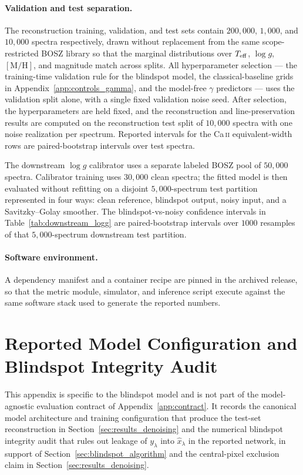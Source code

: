 \documentclass[twocolumn]{aastex7}
\newcounter{algorithm}
\begin{document}
\paragraph{Validation and test separation.}
The reconstruction training, validation, and test sets contain $200{,}000$, $1{,}000$, and $10{,}000$ spectra respectively, drawn without replacement from the same scope-restricted BOSZ library so that the marginal distributions over $T_{\rm eff}$, $\log g$, $[\mathrm{M}/\mathrm{H}]$, and magnitude match across splits. All hyperparameter selection --- the training-time validation rule for the blindspot model, the classical-baseline grids in Appendix~\ref{app:controls_gamma}, and the model-free $\gamma$ predictors --- uses the validation split alone, with a single fixed validation noise seed. After selection, the hyperparameters are held fixed, and the reconstruction and line-preservation results are computed on the reconstruction test split of $10{,}000$ spectra with one noise realization per spectrum. Reported intervals for the Ca\,\textsc{ii} equivalent-width rows are paired-bootstrap intervals over test spectra.

The downstream $\log g$ calibrator uses a separate labeled BOSZ pool of $50{,}000$ spectra. Calibrator training uses $30{,}000$ clean spectra; the fitted model is then evaluated without refitting on a disjoint $5{,}000$-spectrum test partition represented in four ways: clean reference, blindspot output, noisy input, and a Savitzky--Golay smoother. The blindspot-vs-noisy confidence intervals in Table~\ref{tab:downstream_logg} are paired-bootstrap intervals over $1000$ resamples of that $5{,}000$-spectrum downstream test partition.

\paragraph{Software environment.}
A dependency manifest and a container recipe are pinned in the archived release, so that the metric module, simulator, and inference script execute against the same software stack used to generate the reported numbers.

\section{Reported Model Configuration and Blindspot Integrity Audit}
\label{app:architecture_integrity}

This appendix is specific to the blindspot model and is not part of the model-agnostic evaluation contract of Appendix~\ref{app:contract}. It records the canonical model architecture and training configuration that produce the test-set reconstruction in Section~\ref{sec:results_denoising} and the numerical blindspot integrity audit that rules out leakage of $y_{\lambda}$ into $\hat{x}_{\lambda}$ in the reported network, in support of Section~\ref{sec:blindspot_algorithm} and the central-pixel exclusion claim in Section~\ref{sec:results_denoising}.
\end{document}
